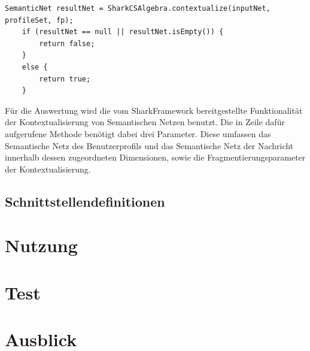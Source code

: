\begin{lstlisting}
SemanticNet resultNet = SharkCSAlgebra.contextualize(inputNet, profileSet, fp);
	if (resultNet == null || resultNet.isEmpty()) {
		return false;
	}
	else {
		return true;
	}
\end{lstlisting}
Für die Auswertung wird die vom SharkFramework bereitgestellte Funktionalität der Kontextualisierung von Semantischen Netzen benutzt. Die in Zeile dafür aufgerufene Methode benötigt dabei drei Parameter. Diese umfassen das Semantische Netz des Benutzerprofils und das Semantische Netz der Nachricht innerhalb dessen zugeordneten Dimensionen, sowie die Fragmentierungsparameter der Kontextualisierung. 


\subsection{Schnittstellendefinitionen}\label{ch:filterinterfaces}


\section{Nutzung}


\section{Test}



\section{Ausblick}
